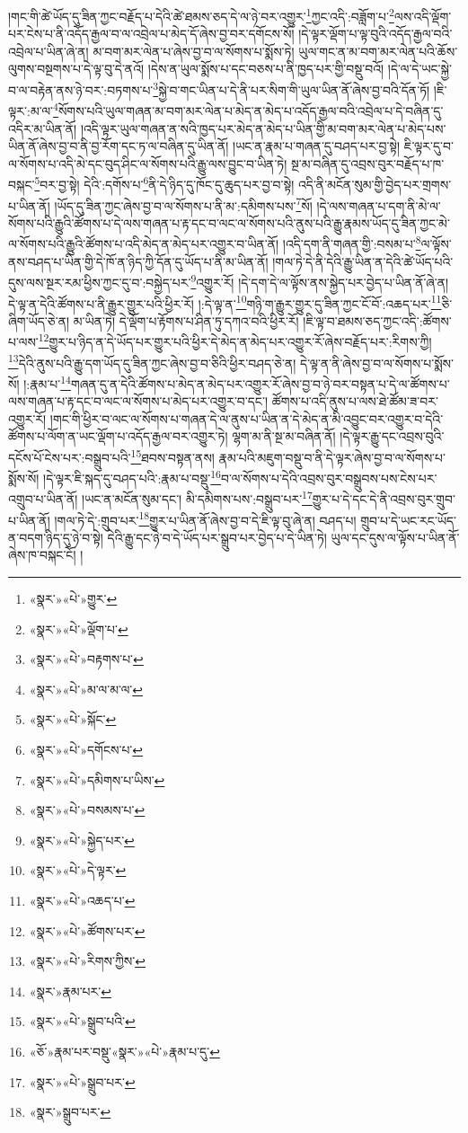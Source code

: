 །གང་གི་ཚེ་ཡོད་དུ་ཟིན་ཀྱང་བརྗོད་པ་དེའི་ཚེ་ཐམས་ཅད་དེ་ལ་ཉེ་བར་འགྱུར་\footnote{«སྣར་»«པེ་»གྱུར་}ཀྱང་འདི་:བཟློག་པ་\footnote{«སྣར་»«པེ་»ལྡོག་པ་}ལས་འདི་ལྡོག་པར་ངེས་པ་ནི་འདོད་རྒྱལ་བ་ལ་འབྲེལ་པ་མེད་དོ་ཞེས་བྱ་བར་དགོངས་སོ། །དེ་ལྟར་ལྡོག་པ་ལྟ་བུའི་འདོད་རྒྱལ་བའི་འབྲེལ་པ་ཡིན་ཞེ་ན། མ་བག་མར་ལེན་པ་ཞེས་བྱ་བ་ལ་སོགས་པ་སྨོས་ཏེ། ཡུལ་གང་ན་མ་བག་མར་ལེན་པའི་ཆོས་ལུགས་བསྔགས་པ་དེ་ལྟ་བུ་དེ་ནའོ། །དེས་ན་ཡུལ་སྨོས་པ་དང་བཅས་པ་ནི་ཁྱད་པར་གྱི་བསྡུ་བའོ། །དེ་ལ་དེ་ཡང་སྐྱེ་བ་ལ་བརྟེན་ནས་ཉེ་བར་:བཏགས་པ་\footnote{«སྣར་»«པེ་»བརྟགས་པ་}སྐྱེ་བ་གང་ཡིན་པ་དེ་ནི་པར་སིག་གི་ཡུལ་ཡིན་ནོ་ཞེས་བྱ་བའི་དོན་ཏོ། །ཇི་ལྟར་:མ་ལ་\footnote{«སྣར་»«པེ་»མ་ལ་མ་ལ་}སོགས་པའི་ཡུལ་གཞན་མ་བག་མར་ལེན་པ་མེད་ན་མེད་པ་འདོད་རྒྱལ་བའི་འབྲེལ་པ་དེ་བཞིན་དུ་འདིར་མ་ཡིན་ནོ། །འདི་ལྟར་ཡུལ་གཞན་ན་སའི་ཁྱད་པར་མེད་ན་མེད་པ་ཡིན་གྱི་མ་བག་མར་ལེན་པ་མེད་པས་ཡིན་ནོ་ཞེས་བྱ་བ་ནི་བྱ་རོག་དང་ཏ་ལ་བཞིན་དུ་ཡིན་ནོ། །ཡང་ན་རྣམ་པ་གཞན་དུ་བཤད་པར་བྱ་སྟེ། ཇི་ལྟར་དུ་བ་ལ་སོགས་པ་འདི་མེ་དང་བུད་ཤིང་ལ་སོགས་པའི་རྒྱུ་ལས་བྱུང་བ་ཡིན་ཏེ། སྔ་མ་བཞིན་དུ་འབྲས་བུར་བརྗོད་པ་ཁ་བསྐང་\footnote{«སྣར་»«པེ་»སྐོང་}བར་བྱ་སྟེ། དེའི་:དགོས་པ་\footnote{«སྣར་»«པེ་»དགོངས་པ་}ནི་དེ་ཉིད་དུ་ཁོང་དུ་ཆུད་པར་བྱ་བ་སྟེ། འདི་ནི་མངོན་སུམ་གྱི་བྱེད་པར་གྲགས་པ་ཡིན་ནོ། །ཡོད་དུ་ཟིན་ཀྱང་ཞེས་བྱ་བ་ལ་སོགས་པ་ནི་མ་:དམིགས་པས་\footnote{«སྣར་»«པེ་»དམིགས་པ་ཡིས་}སོ། །དེ་ལས་གཞན་པ་དག་ནི་མེ་ལ་སོགས་པའི་རྒྱུའི་ཚོགས་པ་དེ་ལས་གཞན་པ་རྟ་དང་བ་ལང་ལ་སོགས་པའི་ནུས་པའི་རྒྱུ་རྣམས་ཡོད་དུ་ཟིན་ཀྱང་མེ་ལ་སོགས་པའི་རྒྱུའི་ཚོགས་པ་འདི་མེད་ན་མེད་པར་འགྱུར་བ་ཡིན་ནོ། །འདི་དག་ནི་གཞན་གྱི་:བསམ་པ་\footnote{«སྣར་»«པེ་»བསམས་པ་}ལ་ལྟོས་ནས་བཤད་པ་ཡིན་གྱི་དེ་ཁོ་ན་ཉིད་ཀྱི་དོན་དུ་ཡོད་པ་ནི་མ་ཡིན་ནོ། །གལ་ཏེ་དེ་ནི་དེའི་རྒྱུ་ཡིན་ན་དེའི་ཚེ་ཡོད་པའི་དུས་ལས་སྔར་རམ་ཕྱིས་ཀྱང་དུ་བ་:བསྐྱེད་པར་\footnote{«སྣར་»«པེ་»སྐྱེད་པར་}འགྱུར་རོ། །དེ་དག་དེ་ལ་ལྟོས་ནས་སྐྱེད་པར་བྱེད་པ་ཡིན་ནོ་ཞེ་ན། དེ་ལྟ་ན་དེའི་ཚོགས་པ་ནི་རྒྱུར་གྱུར་པའི་ཕྱིར་རོ། །:དེ་ལྟ་ན་\footnote{«སྣར་»«པེ་»དེ་ལྟར་}གཉི་ག་རྒྱུར་གྱུར་དུ་ཟིན་ཀྱང་ངོ་བོ་:འཆད་པར་\footnote{«སྣར་»«པེ་»འཆད་པ་}ཅི་ཞིག་ཡོད་ཅེ་ན། མ་ཡིན་ཏེ། དེ་ལྡོག་པ་རྟོགས་པ་ཤིན་ཏུ་དཀའ་བའི་ཕྱིར་རོ། །ཇི་ལྟ་བ་ཐམས་ཅད་ཀྱང་འདི་:ཚོགས་པ་ལས་\footnote{«སྣར་»«པེ་»ཚོགས་པར་}གྱུར་པ་ཉིད་ན་དེ་ཡོད་པར་གྱུར་པའི་ཕྱིར་དེ་མེད་ན་མེད་པར་འགྱུར་རོ་ཞེས་བརྗོད་པར་:རིགས་ཀྱི། \footnote{«སྣར་»«པེ་»རིགས་ཀྱིས་}དེའི་ནུས་པའི་རྒྱུ་དག་ཡོད་དུ་ཟིན་ཀྱང་ཞེས་བྱ་བ་ཅིའི་ཕྱིར་བཤད་ཅེ་ན། དེ་ལྟ་ན་ནི་ཞེས་བྱ་བ་ལ་སོགས་པ་སྨོས་སོ། །:རྣམ་པ་\footnote{«སྣར་»རྣམ་པར་}གཞན་དུ་ན་དེའི་ཚོགས་པ་མེད་ན་མེད་པར་འགྱུར་རོ་ཞེས་བྱ་བ་ཉེ་བར་བསྟན་པ་དེ་ལ་ཚོགས་པ་ལས་གཞན་པ་རྟ་དང་བ་ལང་ལ་སོགས་པ་མེད་པར་འགྱུར་བ་དང་། ཚོགས་པ་འདི་ནུས་པ་ལས་ཐེ་ཚོམ་ཟ་བར་འགྱུར་རོ། །གང་གི་ཕྱིར་བ་ལང་ལ་སོགས་པ་གཞན་དེ་ལ་ནུས་པ་ཡིན་ན་དེ་མེད་ན་མི་འབྱུང་བར་འགྱུར་བ་དེའི་ཚོགས་པ་ལོག་ན་ཡང་ལྡོག་པ་འདོད་རྒྱལ་བར་འགྱུར་ཏེ། ལྷག་མ་ནི་སྔ་མ་བཞིན་ནོ། །དེ་ལྟར་རྒྱུ་དང་འབྲས་བུའི་དངོས་པོ་ངེས་པར་:བསྒྲུབ་པའི་\footnote{«སྣར་»«པེ་»སྒྲུབ་པའི་}ཐབས་བསྟན་ནས། རྣམ་པའི་མཇུག་བསྡུ་བ་ནི་དེ་ལྟར་ཞེས་བྱ་བ་ལ་སོགས་པ་སྨོས་སོ། །དེ་ལྟར་ཇི་སྐད་དུ་བཤད་པའི་:རྣམ་པ་བསྡུ་\footnote{«ཅོ་»རྣམ་པར་བསྡུ་«སྣར་»«པེ་»རྣམ་པ་དུ་}བ་ལ་སོགས་པ་དེའི་འབྲས་བུར་བསྒྲུབས་པས་ངེས་པར་འགྲུབ་པ་ཡིན་ནོ། །ཡང་ན་མངོན་སུམ་དང་། མི་དམིགས་པས་:བསྒྲུབ་པར་\footnote{«སྣར་»«པེ་»སྒྲུབ་པར་}གྱུར་པ་དེ་དང་དེ་ནི་འབྲས་བུར་གྲུབ་པ་ཡིན་ནོ། །གལ་ཏེ་དེ་:གྲུབ་པར་\footnote{«སྣར་»སྒྲུབ་པར་}གྱུར་པ་ཡིན་ནོ་ཞེས་བྱ་བ་དེ་ཇི་ལྟ་བུ་ཞེ་ན། བཤད་པ། གྲུབ་པ་དེ་ཡང་རང་ཡོད་ན་བདག་ཉིད་དུ་ཉེ་བ་སྟེ། དེའི་རྒྱུ་དང་ཉེ་བ་དེ་ཡོད་པར་སྒྲུབ་པར་བྱེད་པ་དེ་ཡིན་ཏེ། ཡུལ་དང་དུས་ལ་ལྟོས་པ་ཡིན་ནོ་ཞེས་ཁ་བསྐང་ངོ། །
